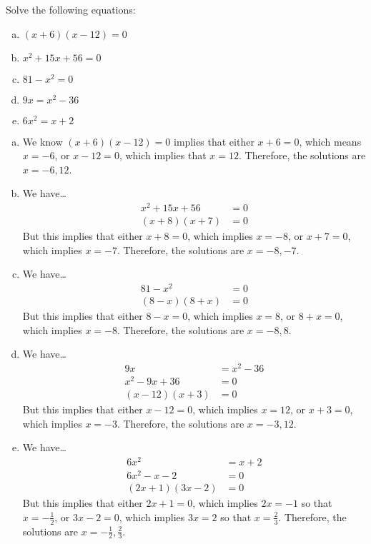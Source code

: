 \documentclass[11pt,letterpaper]{article}
\begin{document}

 Solve the following equations:
	\begin{enumerate}[(a)]
	\item $(x + 6)(x - 12)= 0$
	\item $x^2 + 15x + 56= 0$
	\item $81 - x^2= 0$
	\item $9x= x^2 - 36$
	\item $6x^2= x + 2$
	\end{enumerate} \pspace

\sol 
\begin{enumerate}[(a)]
\item We know $(x + 6)(x - 12)= 0$ implies that either $x + 6= 0$, which means $x= -6$, or $x - 12= 0$, which implies that $x= 12$. Therefore, the solutions are $x= -6, 12$. \pspace

\item We have\dots
	\[
	\begin{aligned}
	x^2 + 15x + 56&= 0 \\
	(x + 8)(x + 7)&= 0
	\end{aligned}
	\]
But this implies that either $x + 8=0$, which implies $x= -8$, or $x + 7= 0$, which implies $x= -7$. Therefore, the solutions are $x= -8, -7$. \pspace

\item We have\dots
	\[
	\begin{aligned}
	81 - x^2&= 0 \\
	(8 - x)(8 + x)&= 0 
	\end{aligned}
	\]
But this implies that either $8 - x= 0$, which implies $x= 8$, or $8 + x= 0$, which implies $x= -8$. Therefore, the solutions are $x= -8, 8$. \pspace

\item We have\dots
	\[
	\begin{aligned}
	9x&= x^2 - 36 \\
	x^2 - 9x + 36&= 0 \\
	(x - 12)(x + 3)&= 0 
	\end{aligned}
	\]
But this implies that either $x - 12= 0$, which implies $x= 12$, or $x + 3= 0$, which implies $x= -3$. Therefore, the solutions are $x= -3, 12$. \pspace

\item We have\dots
	\[
	\begin{aligned}
	6x^2&= x + 2 \\
	6x^2 - x - 2&= 0 \\
	(2x + 1)(3x - 2)&= 0 
	\end{aligned}
	\]
But this implies that either $2x + 1= 0$, which implies $2x= -1$ so that $x= -\frac{1}{2}$, or $3x - 2= 0$, which implies $3x= 2$ so that $x= \frac{2}{3}$. Therefore, the solutions are $x= -\frac{1}{2}, \frac{2}{3}$. 
\end{enumerate}
\end{document}
